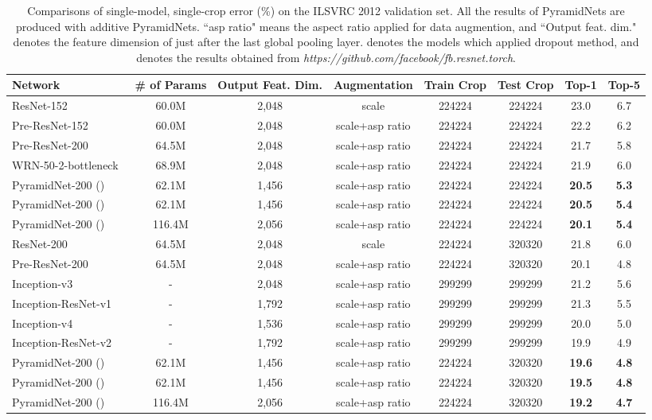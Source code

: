 \documentclass[10pt,twocolumn,letterpaper]{article}
\begin{document}
\begin{table*}[t]
\fontsize{9}{10}\selectfont
\begin{center}
\centering
\begin{tabular}{|l|c|c|c|c|c|c|c|}
\hline
Network & \# of Params & Output Feat. Dim. & Augmentation & Train Crop & Test Crop & Top-1 & Top-5 \\
\hline\hline
ResNet-152~\cite{resnet} & 60.0M & 2,048 & scale & 224224 & 224224 & 23.0 & 6.7 \\
Pre-ResNet-152~\cite{preresnet} & 60.0M & 2,048 & scale+asp ratio & 224224 & 224224 & 22.2 & 6.2\\
Pre-ResNet-200~\cite{preresnet} & 64.5M & 2,048 & scale+asp ratio & 224224 & 224224 & 21.7 & 5.8\\
WRN-50-2-bottleneck~\cite{wideresnet} & 68.9M & 2,048 & scale+asp ratio & 224224 & 224224 & 21.9 & 6.0\\
PyramidNet-200 () & 62.1M & 1,456 & scale+asp ratio & 224224 & 224224 & {\bf20.5} & {\bf5.3}\\
PyramidNet-200 () & 62.1M & 1,456 & scale+asp ratio & 224224 & 224224 & {\bf20.5} & {\bf5.4}\\
PyramidNet-200 () & 116.4M & 2,056 & scale+asp ratio & 224224 & 224224 & {\bf20.1} & {\bf5.4}\\
\hline
ResNet-200~\cite{resnet} & 64.5M & 2,048 & scale & 224224 & 320320 & 21.8 & 6.0\\
Pre-ResNet-200~\cite{preresnet} & 64.5M & 2,048 & scale+asp ratio & 224224 & 320320 & 20.1 & 4.8\\
Inception-v3~\cite{Inceptionv3} & - & 2,048 & scale+asp ratio  & 299299 & 299299 & 21.2 & 5.6\\
Inception-ResNet-v1~\cite{InceptionResnet}  &  - & 1,792 & scale+asp ratio & 299299 & 299299 & 21.3 & 5.5\\
Inception-v4~\cite{InceptionResnet}  & - & 1,536 & scale+asp ratio & 299299 & 299299 & 20.0 & 5.0\\
Inception-ResNet-v2~\cite{InceptionResnet}  &  - & 1,792 & scale+asp ratio & 299299 & 299299 & 19.9 & 4.9\\
PyramidNet-200 () & 62.1M & 1,456 & scale+asp ratio & 224224 & 320320 & {\bf19.6} & {\bf4.8}\\
PyramidNet-200 () & 62.1M & 1,456 & scale+asp ratio & 224224 & 320320 & {\bf19.5} & {\bf4.8}\\
PyramidNet-200 () & 116.4M & 2,056 & scale+asp ratio & 224224 & 320320 & {\bf19.2} & {\bf4.7}\\
\hline
\end{tabular}
\end{center}
\caption{Comparisons of single-model, single-crop error (\%) on the ILSVRC 2012 validation set. All the results of PyramidNets are produced with additive PyramidNets. ``asp ratio" means the aspect ratio applied for data augmention, and ``Output feat. dim." denotes the feature dimension of just after the last global pooling layer.  denotes the models which applied dropout method, and  denotes the results obtained from {\it https://github.com/facebook/fb.resnet.torch}.}
\label{table:imagenetres}
\end{table*}
\end{document}
